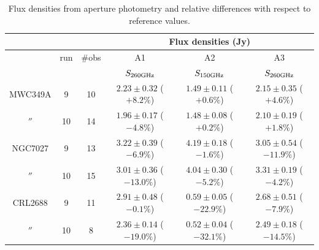\begin{table}[th]
\begin{center}
\begin{tabular}{|c|c|c|c|c|c|}
\hline
\multicolumn{3}{|c}{}  & \multicolumn{3}{|c|}{Flux densities (Jy)}   \\
\hline
         & run  & \#obs &  A1                    &  A2                   &    A3                    \\
         &      &      &  $S_{260 {\rm GHz}}$     &  $S_{150 {\rm GHz}}$  & $S_{260 {\rm GHz}}$    \\
\hline\hline
MWC349A   &  9   & 10  &  $2.23\pm0.32$  ($+8.2\%$)  &  $1.49\pm0.11$ ($+0.6\%$) &  $2.15\pm0.35$ ($+4.6\%$)      \\
  $''$   & 10   & 14  &  $1.96\pm0.17$  ($-4.8\%$)  &  $1.48\pm0.08$ ($+0.2\%$) &  $2.10\pm0.19$ ($+1.8\%$)                  \\ 
  \hline
NGC7027  &  9   & 13  &  $3.22\pm0.39$  ($-6.9\%$)  &  $4.19\pm0.18$ ($-1.6\%$) & $3.05\pm0.54$  ($-11.9\%$)      \\
  $''$   & 10   & 15  &  $3.01\pm0.36$  ($-13.0\%$) &  $4.04\pm0.30$ ($-5.2\%$) & $3.31\pm0.19$  ($-4.2\%$)                   \\ 
  \hline
CRL2688  &  9   & 11  &  $2.91\pm0.48$  ($-0.1\%$)  &  $0.59\pm0.05$ ($-22.9\%$)  &  $2.68\pm0.51$ ($-7.9\%$)     \\
  $''$   & 10   &  8  &  $2.36\pm0.14$  ($-19.0\%$) &  $0.52\pm0.04$ ($-32.1\%$)  &  $2.49\pm0.18$ ($-14.5\%$)                   \\
\hline
\end{tabular}
\caption[Flux densities from aperture photometry]{Flux densities from aperture photometry and relative differences with respect to reference values.}
\label{tab:flux_sec_Ap}
\end{center}
\end{table}

